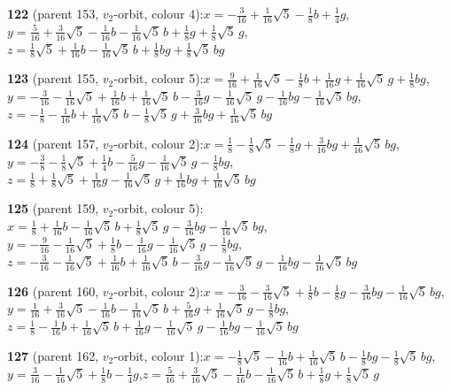 \documentclass[10pt]{article}
\begin{document}
{\noindent\textbf{122} (parent 153, $v_2$-orbit, colour 4):\quad $x=-\tfrac{3}{16}+\tfrac{1}{16}\sqrt5-\tfrac{1}{8}b+\tfrac{1}{4}g$,\quad $y=\tfrac{5}{16}+\tfrac{3}{16}\sqrt5-\tfrac{1}{16}b-\tfrac{1}{16}\sqrt5\,b+\tfrac{1}{8}g+\tfrac{1}{8}\sqrt5\,g$,\quad $z=\tfrac{1}{8}\sqrt5+\tfrac{1}{16}b-\tfrac{1}{16}\sqrt5\,b+\tfrac{1}{8}bg+\tfrac{1}{8}\sqrt5\,bg$\par\smallskip
\noindent\textbf{123} (parent 155, $v_2$-orbit, colour 5):\quad $x=\tfrac{9}{16}+\tfrac{1}{16}\sqrt5-\tfrac{1}{8}b+\tfrac{1}{16}g+\tfrac{1}{16}\sqrt5\,g+\tfrac{1}{8}bg$,\quad $y=-\tfrac{3}{16}-\tfrac{1}{16}\sqrt5+\tfrac{1}{16}b+\tfrac{1}{16}\sqrt5\,b-\tfrac{3}{16}g-\tfrac{1}{16}\sqrt5\,g-\tfrac{1}{16}bg-\tfrac{1}{16}\sqrt5\,bg$,\quad $z=-\tfrac{1}{8}-\tfrac{1}{16}b+\tfrac{1}{16}\sqrt5\,b-\tfrac{1}{8}\sqrt5\,g+\tfrac{3}{16}bg+\tfrac{1}{16}\sqrt5\,bg$\par\smallskip
\noindent\textbf{124} (parent 157, $v_2$-orbit, colour 2):\quad $x=\tfrac{1}{8}-\tfrac{1}{8}\sqrt5-\tfrac{1}{8}g+\tfrac{3}{16}bg+\tfrac{1}{16}\sqrt5\,bg$,\quad $y=-\tfrac{3}{8}-\tfrac{1}{8}\sqrt5+\tfrac{1}{4}b-\tfrac{5}{16}g-\tfrac{1}{16}\sqrt5\,g-\tfrac{1}{8}bg$,\quad $z=\tfrac{1}{8}+\tfrac{1}{8}\sqrt5+\tfrac{1}{16}g-\tfrac{1}{16}\sqrt5\,g+\tfrac{1}{16}bg+\tfrac{1}{16}\sqrt5\,bg$\par\smallskip
\noindent\textbf{125} (parent 159, $v_2$-orbit, colour 5):\quad $x=\tfrac{1}{8}+\tfrac{1}{16}b-\tfrac{1}{16}\sqrt5\,b+\tfrac{1}{8}\sqrt5\,g-\tfrac{3}{16}bg-\tfrac{1}{16}\sqrt5\,bg$,\quad $y=-\tfrac{9}{16}-\tfrac{1}{16}\sqrt5+\tfrac{1}{8}b-\tfrac{1}{16}g-\tfrac{1}{16}\sqrt5\,g-\tfrac{1}{8}bg$,\quad $z=-\tfrac{3}{16}-\tfrac{1}{16}\sqrt5+\tfrac{1}{16}b+\tfrac{1}{16}\sqrt5\,b-\tfrac{3}{16}g-\tfrac{1}{16}\sqrt5\,g-\tfrac{1}{16}bg-\tfrac{1}{16}\sqrt5\,bg$\par\smallskip
\noindent\textbf{126} (parent 160, $v_2$-orbit, colour 2):\quad $x=-\tfrac{3}{16}-\tfrac{3}{16}\sqrt5+\tfrac{1}{8}b-\tfrac{1}{8}g-\tfrac{3}{16}bg-\tfrac{1}{16}\sqrt5\,bg$,\quad $y=\tfrac{1}{16}+\tfrac{3}{16}\sqrt5-\tfrac{1}{16}b-\tfrac{1}{16}\sqrt5\,b+\tfrac{5}{16}g+\tfrac{1}{16}\sqrt5\,g-\tfrac{1}{8}bg$,\quad $z=\tfrac{1}{8}-\tfrac{1}{16}b+\tfrac{1}{16}\sqrt5\,b+\tfrac{1}{16}g-\tfrac{1}{16}\sqrt5\,g-\tfrac{1}{16}bg-\tfrac{1}{16}\sqrt5\,bg$\par\smallskip
\noindent\textbf{127} (parent 162, $v_2$-orbit, colour 1):\quad $x=-\tfrac{1}{8}\sqrt5-\tfrac{1}{16}b+\tfrac{1}{16}\sqrt5\,b-\tfrac{1}{8}bg-\tfrac{1}{8}\sqrt5\,bg$,\quad $y=\tfrac{3}{16}-\tfrac{1}{16}\sqrt5+\tfrac{1}{8}b-\tfrac{1}{4}g$,\quad $z=\tfrac{5}{16}+\tfrac{3}{16}\sqrt5-\tfrac{1}{16}b-\tfrac{1}{16}\sqrt5\,b+\tfrac{1}{8}g+\tfrac{1}{8}\sqrt5\,g$\par\smallskip
}
\end{document}
